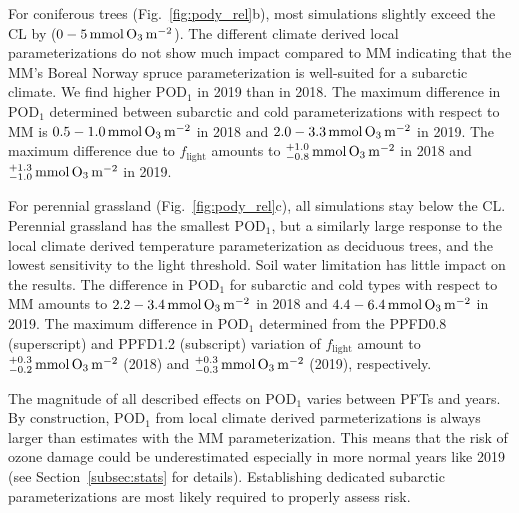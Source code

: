 \documentclass[bg, manuscript]{copernicus}
\begin{document}
For coniferous trees (Fig.~\ref{fig:pody_rel}b), most simulations slightly exceed the CL by ($0-5\,\unit{mmol\,\chem{O_3}\,m^{-2}}$). The different climate derived local parameterizations do not show much impact compared to MM indicating that the MM's Boreal Norway spruce parameterization is well-suited for a subarctic climate. We find higher $\mathrm{POD_1}$ in 2019 than in 2018. The maximum difference in $\mathrm{POD_1}$ determined between subarctic and cold parameterizations with respect to MM is $0.5-1.0\,\unit{mmol\,\chem{O_3}\,m^{-2}}$ in 2018 and $2.0-3.3\,\unit{mmol\,\chem{O_3}\,m^{-2}}$ in 2019. The maximum difference due to $f_\mathrm{light}$ amounts to $^{+1.0}_{-0.8}\,\unit{mmol\,\chem{O_3}\,m^{-2}}$ in 2018 and $^{+1.3}_{-1.0}\,\unit{mmol\,\chem{O_3}\,m^{-2}}$ in 2019.

For perennial grassland (Fig.~\ref{fig:pody_rel}c), all simulations stay below the CL. Perennial grassland has the smallest $\mathrm{POD_1}$, but a similarly large response to the local climate derived temperature parameterization as deciduous trees, and the lowest sensitivity to the light threshold. Soil water limitation has little impact on the results. The difference in $\mathrm{POD_1}$ for subarctic and cold types with respect to MM amounts to $2.2-3.4\,\unit{mmol\,\chem{O_3}\,m^{-2}}$ in 2018 and $4.4-6.4\,\unit{mmol\,\chem{O_3}\,m^{-2}}$ in 2019. The maximum difference in $\mathrm{POD_1}$ determined from the PPFD0.8 (superscript) and PPFD1.2 (subscript) variation of $f_\mathrm{light}$ amount to $^{+0.3}_{-0.2}\,\unit{mmol\,\chem{O_3}\,m^{-2}}$ (2018) and $^{+0.3}_{-0.3}\,\unit{mmol\,\chem{O_3}\,m^{-2}}$ (2019), respectively.

The magnitude of all described effects on $\mathrm{POD_1}$ varies between PFTs and years. By construction, $\mathrm{POD_1}$ from local climate derived parmeterizations is always larger than estimates with the MM parameterization. This means that the risk of ozone damage could be underestimated especially in more normal years like 2019 (see Section~\ref{subsec:stats} for details). Establishing dedicated subarctic parameterizations are most likely required to properly assess risk.
\end{document}
